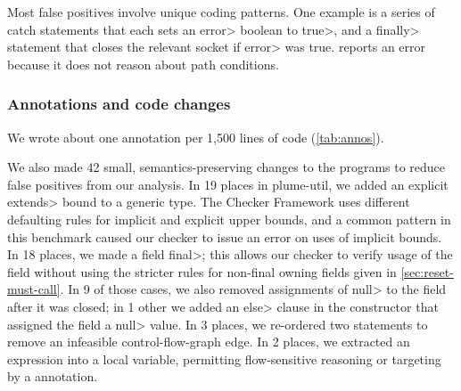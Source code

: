 Most false positives involve unique coding patterns.
One example
 is a series of catch
statements that each sets an \<error> boolean to \<true>, and
a \<finally> statement that closes the relevant socket if \<error>
was true.  \Tool reports an error because it does not reason about path
conditions.

\subsubsection{Annotations and code changes}\label{sec:annotations-and-code-changes}
\label{sec:annos}



We wrote about one annotation per 1,500 lines of code (\cref{tab:annos}).

We also
made 42 small, semantics-preserving changes to the programs to reduce
false positives from our analysis.
%
In 19 places in plume-util, we added an explicit \<extends> bound to a generic type.
The Checker Framework uses different defaulting rules for implicit and explicit
upper bounds, and a common pattern in this benchmark caused our checker to issue
an error on uses of implicit bounds.
%
In 18 places, we made a field \<final>; this allows our checker to verify usage
of the field without using the stricter rules for non-final owning fields given in \cref{sec:reset-must-call}.
In 9 of those cases, we also removed assignments of \<null> to the field after it was closed; in 1 other we added an \<else> clause in the constructor that assigned the field
a \<null> value.
%
In 3 places, we re-ordered two statements to remove an
infeasible control-flow-graph edge.
%
In 2 places, we extracted an expression into a local variable, permitting
flow-sensitive reasoning or targeting by a \CreatesMustCallFor annotation.

